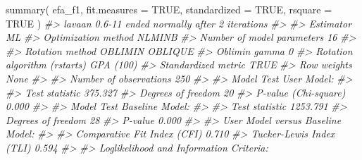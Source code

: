 \documentclass[
  11pt,
]{krantz}
\makeatletter
\newenvironment{Shaded}{\begin{snugshade}}{\end{snugshade}}
\newcommand{\AttributeTok}[1]{\textcolor[rgb]{0.61,0.61,0.61}{#1}}
\newcommand{\CommentTok}[1]{\textcolor[rgb]{0.37,0.37,0.37}{\textit{#1}}}
\newcommand{\ConstantTok}[1]{\textcolor[rgb]{0,0,0}{#1}}
\newcommand{\FunctionTok}[1]{\textcolor[rgb]{0,0,0}{#1}}
\newcommand{\NormalTok}[1]{#1}
\newenvironment{kframe}{%
\medskip{}
\setlength{\fboxsep}{.8em}
 \def\at@end@of@kframe{}%
 \ifinner\ifhmode%
  \def\at@end@of@kframe{\end{minipage}}%
  \begin{minipage}{\columnwidth}%
 \fi\fi%
 \def\FrameCommand##1{\hskip\@totalleftmargin \hskip-\fboxsep
 \colorbox{shadecolor}{##1}\hskip-\fboxsep
     \hskip-\linewidth \hskip-\@totalleftmargin \hskip\columnwidth}%
 \MakeFramed {\advance\hsize-\width
   \@totalleftmargin\z@ \linewidth\hsize
   \@setminipage}}%
 {\par\unskip\endMakeFramed%
 \at@end@of@kframe}
\renewenvironment{Shaded}{\begin{kframe}}{\end{kframe}}
\theoremstyle{definition}
\theoremstyle{definition}
\theoremstyle{definition}
\theoremstyle{definition}
\theoremstyle{remark}
\makeatother
\begin{document}
\begin{Shaded}
\begin{Highlighting}[]
\FunctionTok{summary}\NormalTok{(}
\NormalTok{  efa\_f1,}
  \AttributeTok{fit.measures =} \ConstantTok{TRUE}\NormalTok{,}
  \AttributeTok{standardized =} \ConstantTok{TRUE}\NormalTok{,}
  \AttributeTok{rsquare =} \ConstantTok{TRUE}
\NormalTok{)}
\CommentTok{\#\textgreater{} lavaan 0.6{-}11 ended normally after 2 iterations}
\CommentTok{\#\textgreater{} }
\CommentTok{\#\textgreater{}   Estimator                                         ML}
\CommentTok{\#\textgreater{}   Optimization method                           NLMINB}
\CommentTok{\#\textgreater{}   Number of model parameters                        16}
\CommentTok{\#\textgreater{}                                                       }
\CommentTok{\#\textgreater{}   Rotation method                      OBLIMIN OBLIQUE}
\CommentTok{\#\textgreater{}   Oblimin gamma                                      0}
\CommentTok{\#\textgreater{}   Rotation algorithm (rstarts)               GPA (100)}
\CommentTok{\#\textgreater{}   Standardized metric                             TRUE}
\CommentTok{\#\textgreater{}   Row weights                                     None}
\CommentTok{\#\textgreater{}                                                       }
\CommentTok{\#\textgreater{}   Number of observations                           250}
\CommentTok{\#\textgreater{}                                                       }
\CommentTok{\#\textgreater{} Model Test User Model:}
\CommentTok{\#\textgreater{}                                                       }
\CommentTok{\#\textgreater{}   Test statistic                               375.327}
\CommentTok{\#\textgreater{}   Degrees of freedom                                20}
\CommentTok{\#\textgreater{}   P{-}value (Chi{-}square)                           0.000}
\CommentTok{\#\textgreater{} }
\CommentTok{\#\textgreater{} Model Test Baseline Model:}
\CommentTok{\#\textgreater{} }
\CommentTok{\#\textgreater{}   Test statistic                              1253.791}
\CommentTok{\#\textgreater{}   Degrees of freedom                                28}
\CommentTok{\#\textgreater{}   P{-}value                                        0.000}
\CommentTok{\#\textgreater{} }
\CommentTok{\#\textgreater{} User Model versus Baseline Model:}
\CommentTok{\#\textgreater{} }
\CommentTok{\#\textgreater{}   Comparative Fit Index (CFI)                    0.710}
\CommentTok{\#\textgreater{}   Tucker{-}Lewis Index (TLI)                       0.594}
\CommentTok{\#\textgreater{} }
\CommentTok{\#\textgreater{} Loglikelihood and Information Criteria:}

\end{Highlighting}
\end{Shaded}
\end{document}
